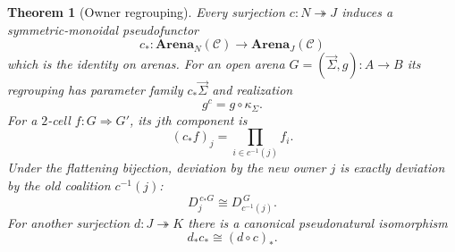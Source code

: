 \documentclass[11pt,a4paper]{article}
\numberwithin{equation}{section}
\newtheorem{theorem}{Theorem}[section]
\theoremstyle{definition}
\theoremstyle{remark}
\theoremstyle{plain}
\begin{document}
\begin{theorem}[Owner regrouping]
\label{thm:egt-owner-regrouping}
Every surjection $c:N\twoheadrightarrow J$ induces a symmetric-monoidal
pseudofunctor
\[
 c_*:\mathbf{Arena}_N(\mathcal C)
 \longrightarrow
 \mathbf{Arena}_J(\mathcal C)
\]
which is the identity on arenas. For an open arena
$G=(\vec\Sigma,g):A\to B$ its regrouping has parameter family
$c_*\vec\Sigma$ and realization
\[
 g^c=g\circ\kappa_\Sigma.
\]
For a $2$-cell $f:G\Rightarrow G'$, its $j$th component is
\[
 (c_*f)_j=\prod_{i\in c^{-1}(j)}f_i.
\]
Under the flattening bijection, deviation by the new owner $j$ is exactly
deviation by the old coalition $c^{-1}(j)$:
\[
 D_j^{\,c_*G}\cong D_{c^{-1}(j)}^{\,G}.
\]
For another surjection $d:J\twoheadrightarrow K$ there is a canonical
pseudonatural isomorphism
\[
 d_*c_*\cong(d\circ c)_*.
\]
\end{theorem}
\end{document}
